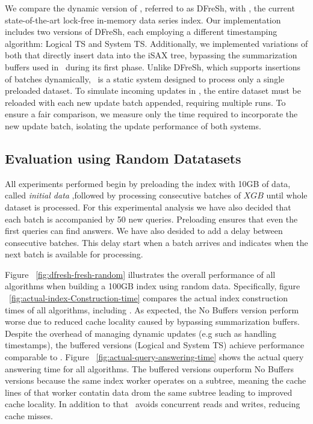 We compare the dynamic version of \Fresh, referred to as DFreSh, with \Fresh, 
the current state-of-the-art lock-free in-memory data series index. Our implementation 
includes two versions of DFreSh, each employing a different timestamping algorithm: 
Logical TS and System TS. Additionally, we implemented variations of both that directly 
insert data into the iSAX tree, bypassing the summarization buffers used in 
\Fresh\ during its first phase.
Unlike DFreSh, which supports insertions of batches dynamically, \Fresh\ is a static
system designed to process only a single preloaded dataset. To simulate incoming updates
in \Fresh, the entire dataset must be reloaded with each new update batch appended, requiring 
multiple runs. To ensure a fair comparison, we measure only the time required to 
incorporate the new update batch, isolating the update performance of both systems.

\subsection{Evaluation using Random Datatasets}
All experiments performed begin by preloading the index with 10GB of data, called
\textit{initial data} ,followed by processing consecutive batches of $XGB$ until 
whole dataset is processed. For this experimental analysis we have also decided
that each batch is accompanied by 50 new queries. Preloading ensures that even the first 
queries can find answers. We have also desided to add a delay between consecutive batches.
This delay start when a batch arrives and indicates when the next batch is available for
processing.

Figure ~\ref{fig:dfresh-fresh-random} illustrates the overall performance of all 
algorithms when building a 100GB index using random data. Specifically,
figure ~\ref{fig:actual-index-Construction-time} compares the actual index construction times 
of all algorithms, including \Fresh. As expected, the No Buffers version 
perform worse due to reduced cache locality caused by bypassing summarization buffers.
Despite the overhead of managing dynamic updates (e.g such as handling timestamps), 
the buffered versions (Logical and System TS) achieve performance comparable to \Fresh. 
Figure ~\ref{fig:actual-query-answering-time} shows the 
actual query answering time for all algorithms. The buffered versions ouperform No Buffers versions 
because the same index worker operates on a subtree, meaning the cache lines of that worker 
contatin data drom the same subtree leading to improved cache locality. In addition to that
\Fresh\ avoids concurrent reads and writes, reducing cache misses.



